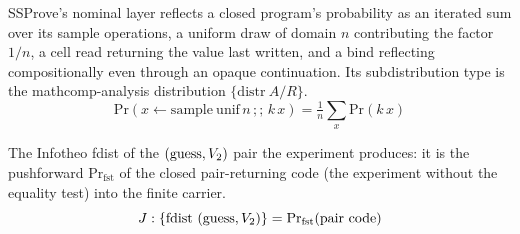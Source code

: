 \begin{lemma}
  \label{lem:exist_pr_code}
  \rocqok
  SSProve's nominal layer reflects a closed program's probability as an iterated
  sum over its sample operations, a uniform draw of domain $n$ contributing the
  factor $1/n$, a cell read returning the value last written, and a bind
  reflecting compositionally even through an opaque continuation. Its
  subdistribution type is the mathcomp-analysis distribution
  $\{\mathrm{distr}\ A/R\}$.
  \[ \mathrm{Pr}(x \leftarrow \mathrm{sample}\ \mathrm{unif}\,n \,;;\, k\,x)
        = \tfrac1n{\textstyle\sum_x}\mathrm{Pr}(k\,x) \]
\end{lemma}

\begin{definition}
  \label{def:guess_joint_fdist}
  \rocqok
  The Infotheo fdist of the $(\mathrm{guess},V_2)$ pair the experiment produces: it is
  the pushforward $\mathrm{Pr}_{\mathrm{fst}}$ of the closed pair-returning code
  (the experiment without the equality test) into the finite carrier.
  \[ J : \{\mathrm{fdist}\ (\mathrm{guess},V_2)\}
        = \mathrm{Pr}_{\mathrm{fst}}(\text{pair code}) \]
\end{definition}

